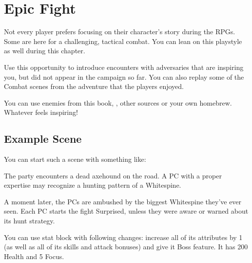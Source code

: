 \section{Epic Fight}
\label{sec:epicFight}

Not every player prefers focusing on their character's story during the RPGs. Some are here for a challenging, tactical combat. You can lean on this playstyle as well during this chapter.

Use this opportunity to introduce encounters with adversaries that are inspiring you, but did not appear in the campaign so far. You can also replay some of the Combat scenes from the adventure that the players enjoyed.

You can use enemies from this book, \bookWorldGuide{}, other sources or your own homebrew. Whatever feels inspiring!




\subsection{Example Scene}

You can start such a scene with something like:


The party encounters a dead axehound on the road. A PC with a proper expertise may recognize a hunting pattern of a Whitespine.

A moment later, the PCs are ambushed by the biggest Whitespine they've ever seen. Each PC starts the fight Surprised, unless they were aware or warned about its hunt strategy.

You can use \enemyWhitespine{} stat block with following changes: increase all of its attributes by 1 (as well as all of its skills and attack bonuses) and give it Boss feature. It has 200 Health and 5 Focus.